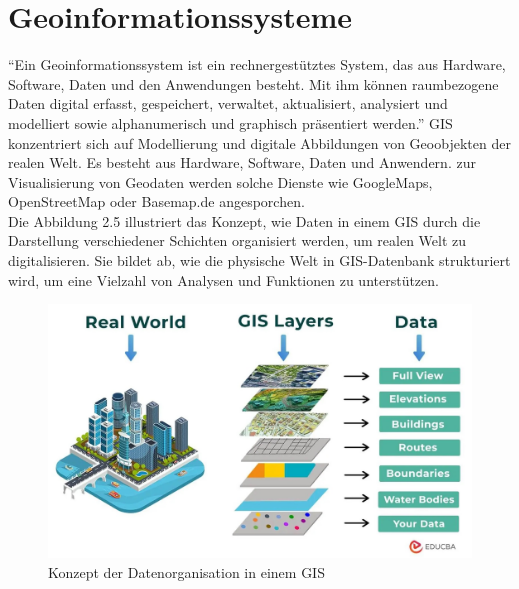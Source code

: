 \section{Geoinformationssysteme}


``Ein Geoinformationssystem ist ein rechnergestütztes System, das aus Hardware, Software, Daten und den Anwendungen besteht. Mit ihm können raumbezogene Daten digital erfasst, gespeichert, verwaltet, aktualisiert, analysiert und modelliert sowie alphanumerisch und graphisch präsentiert werden.'' \citep[S. ~375]{de_lange_geoinformatik_2020} GIS konzentriert sich auf Modellierung und digitale Abbildungen von Geoobjekten der realen Welt. Es besteht aus Hardware, Software, Daten und Anwendern. zur Visualisierung von Geodaten werden solche Dienste wie GoogleMaps, OpenStreetMap oder Basemap.de angesporchen. \\


Die Abbildung 2.5 illustriert das Konzept, wie Daten in einem GIS durch die Darstellung verschiedener Schichten organisiert werden, um realen Welt zu digitalisieren. Sie bildet ab, wie die physische Welt in GIS-Datenbank strukturiert wird, um eine Vielzahl von Analysen und Funktionen zu unterstützen. 
\begin{figure}[ht]
  \centering
  \includegraphics[width=\linewidth]{images/gis.jpg}
  \caption{Konzept der Datenorganisation in einem GIS \citep{gis_bild}}
  \label{fig:meineabbildung}
\end{figure}

